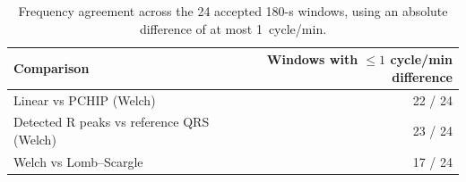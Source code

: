 \begin{table}[htbp]
\centering
\begin{tabular}{lr}
\toprule
Comparison & Windows with $\leq 1$ cycle/min difference \\
\midrule
Linear vs PCHIP (Welch) & 22 / 24 \\
Detected R peaks vs reference QRS (Welch) & 23 / 24 \\
Welch vs Lomb--Scargle & 17 / 24 \\
\bottomrule
\end{tabular}
\caption{Frequency agreement across the 24 accepted 180-s windows, using an absolute difference of at most 1~cycle/min.}

\label{tab:consistency}
\end{table}
